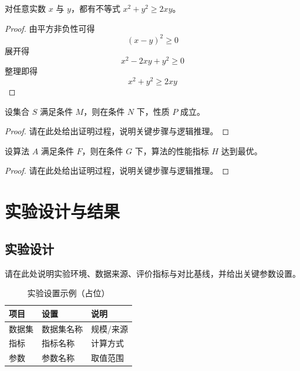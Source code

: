 \documentclass[unicode,master,submission,final]{scutthesis}
\begin{document}
\begin{proposition}\label{ch2/prop:2}
    对任意实数 $x$ 与 $y$，都有不等式 $x^2+y^2\ge 2xy$。
\end{proposition}
\begin{proof}
    由平方非负性可得
    \begin{equation}
        (x-y)^2\ge 0
    \end{equation}
    展开得
    \begin{equation}
        x^2-2xy+y^2\ge 0
    \end{equation}
    整理即得
    \begin{equation}
        x^2+y^2\ge 2xy
    \end{equation}
\end{proof}

\begin{lemma}\label{ch2/lemma:1}
    设集合 $S$ 满足条件 $M$，则在条件 $N$ 下，性质 $P$ 成立。
\end{lemma}
\begin{proof}
    请在此处给出证明过程，说明关键步骤与逻辑推理。
\end{proof}

\begin{theorem}\label{ch2/theorem:1}
    设算法 $A$ 满足条件 $F$，则在条件 $G$ 下，算法的性能指标 $H$ 达到最优。
\end{theorem}
\begin{proof}
    请在此处给出证明过程，说明关键步骤与逻辑推理。
\end{proof}

\chapter{实验设计与结果}

\section{实验设计}

请在此处说明实验环境、数据来源、评价指标与对比基线，并给出关键参数设置。

\begin{table}[htbp]
    \centering\wuhao
    \caption{实验设置示例（占位）}
    \label{tab:exp-setup}
    \begin{tabular}{lll}
        \toprule
        项目&设置&说明\\
        \midrule
        数据集&数据集名称&规模/来源\\
        指标&指标名称&计算方式\\
        参数&参数名称&取值范围\\
        \bottomrule
    \end{tabular}
\end{table}
\end{document}
